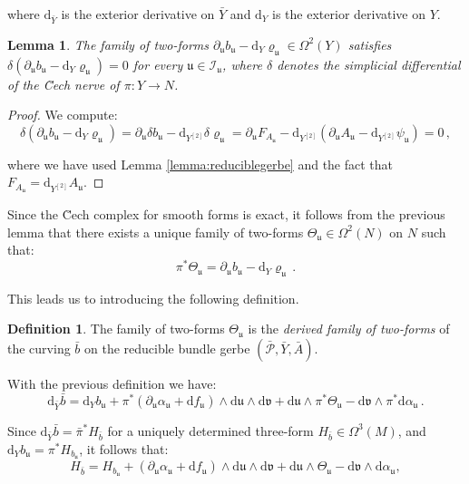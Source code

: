 \documentclass[10pt,a4paper,twoside,reqno]{amsart}
\theoremstyle{plain}
\newtheorem{lemma}[thm]{Lemma}
\theoremstyle{definition}
\newtheorem{definition}[thm]{Definition}
\theoremstyle{remark}
\def\dd{\mathrm{d}}
\def\cI{\mathcal{I}}
\def\cP{\mathcal{P}}
\def\cP{\mathcal{P}}
\def\dd{\mathrm{d}}
\def\fru{\mathfrak{u}}
\def\frv{\mathfrak{v}}
\begin{document}
\noindent
where $\dd_{\bar{Y}}$ is the exterior derivative on $\bar{Y}$ and $\dd_Y$ is the exterior derivative on $Y$.

\begin{lemma}
The family of two-forms $\partial_{\fru} b_{\fru} - \dd_Y \varrho_{\fru} \in \Omega^2(Y)$ satisfies $\delta (\partial_{\fru} b_{\fru} - \dd_Y \varrho_{\fru}) = 0$ for every $\fru \in \cI_{\fru}$, where $\delta$ denotes the simplicial differential of the \u{C}ech nerve of $\pi \colon Y\to N$. 
\end{lemma}

\begin{proof}
We compute:
\begin{equation*}
\delta (\partial_{\fru} b_{\fru} - \dd_Y \varrho_{\fru}) = \partial_{\fru} \delta b_{\fru} - \dd_{Y^{[2]}} \delta \varrho_{\fru} =  \partial_{\fru} F_{A_{\fru}}- \dd_{Y^{[2]}} (\partial_{\fru} A_{\fru} - \dd_{Y^{[2]}} \psi_{\fru}) = 0 \, ,
\end{equation*}

\noindent
where we have used Lemma \ref{lemma:reduciblegerbe} and the fact that $F_{A_{\fru}} = \dd_{Y^{[2]}} A_{\fru}$.
\end{proof}

\noindent
Since the \u{C}ech complex for smooth forms is exact, it follows from the previous lemma that there exists a unique family of two-forms $\Theta_{\fru} \in \Omega^2(N)$ on $N$ such that:
\begin{equation}
\label{eq:buevaluation}
\pi^{\ast} \Theta_{\fru} = \partial_{\fru} b_{\fru} - \dd_Y \varrho_{\fru} \, .
\end{equation}

\noindent
This leads us to introducing the following definition.
\begin{definition}
The family of two-forms $\Theta_{\fru}$ is the \emph{derived family of two-forms} of the curving $\bar{b}$ on the reducible bundle gerbe $(\bar{\cP},\bar{Y},\bar{A})$.
\end{definition}

\noindent
With the previous definition we have:
\begin{equation*}
\dd_{\bar{Y}}\bar{b} = \dd_Y b_{\fru} + \pi^{\ast}(\partial_{\fru}\alpha_{\fru} + \dd f_{\fru}) \wedge \dd\fru \wedge \dd \frv + \dd \fru \wedge \pi^{\ast}\Theta_{\fru} - \dd\frv \wedge \pi^{\ast}\dd \alpha_{\fru}\, .
\end{equation*}

\noindent
Since $\dd_{\bar{Y}} \bar{b} = \bar{\pi}^{\ast} H_{\bar{b}}$ for a uniquely determined three-form $H_{\bar{b}}\in \Omega^3(M)$, and $\dd_Y b_{\fru} = \pi^{\ast} H_{b_{\fru}}$, it follows that:
\begin{equation}
\label{eq:decompositionH}
H_{\bar{b}} =  H_{b_{\fru}} + (\partial_{\fru}\alpha_{\fru} + \dd f_{\fru}) \wedge \dd\fru \wedge \dd \frv + \dd \fru \wedge \Theta_{\fru} - \dd\frv \wedge  \dd \alpha_{\fru},
\end{equation}
\end{document}
